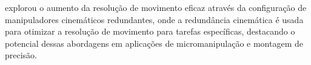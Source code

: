 
\cite{hammond2011} explorou o aumento da resolução de movimento eficaz através da configuração de manipuladores cinemáticos
redundantes, onde a redundância cinemática é usada para otimizar a resolução de movimento para tarefas específicas, destacando o potencial dessas
abordagens em aplicações de micromanipulação e montagem de precisão.


